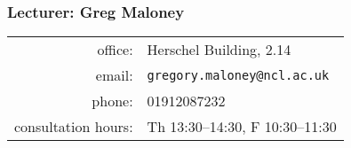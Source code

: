 \begin{frame}
\frametitle{Lecturer: Greg Maloney}
\begin{tabular}{rl}
office: & Herschel Building, 2.14 \\
email: & \texttt{gregory.maloney@ncl.ac.uk} \\
phone: & 01912087232 \\
consultation hours: & Th 13:30--14:30, F 10:30--11:30 \\
\end{tabular}
\end{frame}
